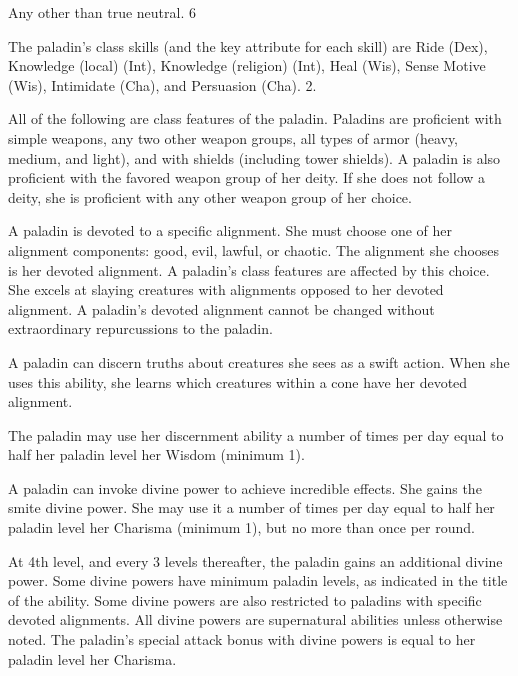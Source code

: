  Any other than true neutral.
 6

The paladin's class skills (and the key attribute for each skill) are Ride (Dex), Knowledge (local) (Int), Knowledge (religion) (Int), Heal (Wis), Sense Motive (Wis), Intimidate (Cha), and Persuasion (Cha).
 2.

All of the following are class features of the paladin.
   Paladins are proficient with simple weapons,  any two other weapon groups,  all types of armor (heavy, medium, and light), and with  shields (including tower shields). A paladin is also proficient with the favored weapon group of her deity. If she does not follow a deity, she is proficient with any other weapon group of her choice.

 A paladin is devoted to a specific alignment. She must choose one of her alignment components: good, evil, lawful, or chaotic. The alignment she chooses is her devoted alignment. A paladin's class features are affected by this choice. She excels at slaying creatures with alignments opposed to her devoted alignment. A paladin's devoted alignment cannot be changed without extraordinary repurcussions to the paladin.

 A paladin can discern truths about creatures she sees as a swift action. When she uses this ability, she learns which creatures within a \arealarge cone have her devoted alignment.

The paladin may use her discernment ability a number of times per day equal to half her paladin level \add her Wisdom (minimum 1).

 A paladin can invoke divine power to achieve incredible effects. She gains the smite divine power. She may use it a number of times per day equal to half her paladin level \add her Charisma (minimum 1), but no more than once per round.

At 4th level, and every 3 levels thereafter, the paladin gains an additional divine power. Some divine powers have minimum paladin levels, as indicated in the title of the ability. Some divine powers are also restricted to paladins with specific devoted alignments. All divine powers are supernatural abilities unless otherwise noted. The paladin's special attack bonus with divine powers is equal to her paladin level \add her Charisma.

